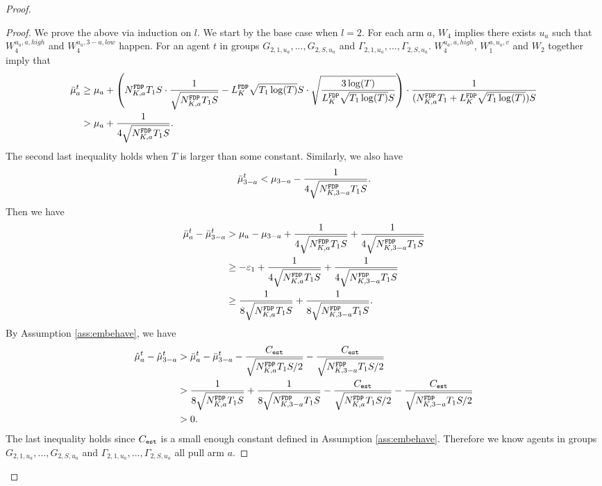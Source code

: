 \begin{proof}
\begin{proof}
We prove the above via induction on $l$. %
We start by the base case when $l=2$. For each arm $a$, $W_4$ implies there exists $u_a$ such that $W^{u_a,a,high}_4$ and $W^{u_a,3-a,low}_4$ happen. For an agent $t$  in groups $G_{2,1,u_a},...,G_{2,S,u_a}$ and $\Gamma_{2,1,u_a},...,\Gamma_{2,S,u_a}$.
$W_4^{u_a,a,high}$,  $W_1^{a,u_a,v}$ and $W_2$ together imply that 
\begin{align*}
\bar{\mu}_a ^t &\geq \mu_a + \left(\fdpN T_1S \cdot \frac{1}{\sqrt{\fdpN T_1S}} - \GdT \sqrt{T_1\log(T)} S\cdot \sqrt{\frac{3\log(T)}{ \GdT \sqrt{T_1\log(T)}S}} \right) \cdot \frac{1}{(\fdpN T_1+ \GdT \sqrt{T_1\log(T)})S} \\
&> \mu_a + \frac{1}{4\sqrt{\fdpN T_1S}}.
\end{align*}
The second last inequality holds when $T$ is larger than some constant.
Similarly, we also have
\[
\bar{\mu}_{3-a}^t< \mu_{3-a}   - \frac{1}{4\sqrt{\fdpN[3-a] T_1S}}.
\]
Then we have
\begin{align*}
\bar{\mu}^t_a - \bar{\mu}^t_{3-a} &> \mu_a - \mu_{3-a} + \frac{1}{4\sqrt{\fdpN T_1S}} + \frac{1}{4\sqrt{\fdpN[3-a] T_1S}}\\
&\geq -\varepsilon_1+ \frac{1}{4\sqrt{\fdpN T_1S}} + \frac{1}{4\sqrt{\fdpN[3-a] T_1S}}\\
&\geq \frac{1}{8\sqrt{\fdpN T_1S}} + \frac{1}{8\sqrt{\fdpN[3-a] T_1S}}.
\end{align*}
By Assumption \ref{ass:embehave}, we have
\begin{align*}
\hat{\mu}_a^t - \hat{\mu}_{3-a}^t &> \bar{\mu}^t_a - \bar{\mu}^t_{3-a} -  \frac{\estC}{\sqrt{\fdpN T_1S/2}} - \frac{\estC}{\sqrt{\fdpN[3-a] T_1S/2}}\\
&> \frac{1}{8\sqrt{\fdpN T_1S}} + \frac{1}{8\sqrt{\fdpN[3-a] T_1S}} -   \frac{\estC}{\sqrt{\fdpN T_1S/2}} - \frac{\estC}{\sqrt{\fdpN[3-a] T_1S/2}}\\
&>0.
\end{align*}
The last inequality holds since $\estC$ is a small enough constant defined in Assumption \ref{ass:embehave}. Therefore we know agents in groups $G_{2,1,u_a},...,G_{2,S,u_a}$ and $\Gamma_{2,1,u_a},...,\Gamma_{2,S,u_a}$ all pull arm $a$.


\end{proof}
\end{proof}
